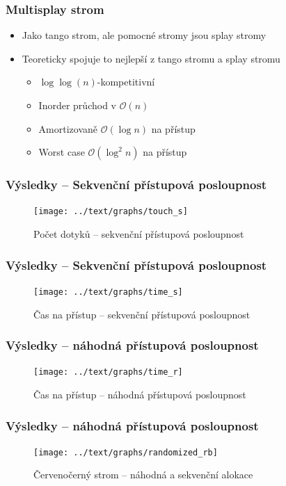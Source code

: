 \documentclass{beamer}
\begin{document}
\begin{frame}
\frametitle{Multisplay strom}
\begin{itemize}
\item Jako tango strom, ale pomocné stromy jsou splay stromy
\item Teoreticky spojuje to nejlepší z tango stromu a splay stromu
\begin{itemize}
\item $\log\log(n)$-kompetitivní
\item Inorder průchod v $\mathcal O(n)$
\item Amortizovaně $\mathcal O(\log n)$ na přístup
\item Worst case $\mathcal O(\log^2 n)$ na přístup
\end{itemize}
\end{itemize}
\end{frame}

\begin{frame}
\frametitle{Výsledky -- Sekvenční přístupová posloupnost}
\begin{figure}[h!]
  \centering
  \texttt{[image: ../text/graphs/touch\_s]}
\caption{Počet dotyků -- sekvenční přístupová posloupnost} 
\end{figure}
\end{frame}

\begin{frame}
\frametitle{Výsledky -- Sekvenční přístupová posloupnost}
\begin{figure}[h!]
  \centering
  \texttt{[image: ../text/graphs/time\_s]}
\caption{Čas na přístup -- sekvenční přístupová posloupnost} 
\end{figure}
\end{frame}

\begin{frame}
\frametitle{Výsledky -- náhodná přístupová posloupnost}
\begin{figure}[h!]
  \centering
  \texttt{[image: ../text/graphs/time\_r]}
\caption{Čas na přístup -- náhodná přístupová posloupnost} 
\end{figure}
\end{frame}

\begin{frame}
\frametitle{Výsledky -- náhodná přístupová posloupnost}
\begin{figure}[h!]
  \centering
  \texttt{[image: ../text/graphs/randomized\_rb]}
\caption{Červenočerný strom -- náhodná a sekvenční alokace} 
\end{figure}
\end{frame}
\end{document}

